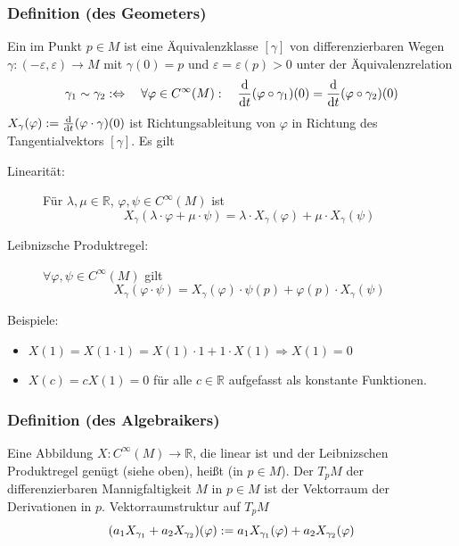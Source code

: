 \subsubsection[Definition: Tangentialraum (geometrisch)]{Definition (des Geometers)} %
\label{ssub:151}
Ein  im Punkt $p \in M$ ist eine Äquivalenzklasse $[\gamma]$ von differenzierbaren Wegen $\gamma : (-\varepsilon, \varepsilon) \to M$ mit 
$\gamma(0)=p$ und $\varepsilon = \varepsilon(p)>0$ unter der Äquivalenzrelation
\[
	\gamma_1 \sim \gamma_2 :\Leftrightarrow \quad \forall \varphi \in C^\infty(M) :\quad  \frac{\mathrm{d} }{\mathrm{d} t} ( \varphi \circ \gamma_1)(0) = \frac{\mathrm{d} }{\mathrm{d} t}  (\varphi \circ \gamma_2) (0)   
\]
$X_\gamma(\varphi) := \frac{\mathrm{d} }{\mathrm{d} t}  (\varphi \cdot \gamma)(0)$ ist  Richtungsableitung von $\varphi$ in Richtung des Tangentialvektors $[\gamma]$. Es gilt
\begin{description}
	\item[Linearität:] Für $\lambda , \mu \in \mathds{R}$, $\varphi, \psi \in C^\infty(M) $ ist
	\[
		X_\gamma(\lambda  \cdot \varphi + \mu \cdot \psi) = \lambda \cdot X_\gamma(\varphi) + \mu \cdot X_\gamma(\psi)
	\] 
	\item[Leibnizsche Produktregel:] $\forall \varphi, \psi \in C^\infty(M) $ gilt
	\[
		X_\gamma(\varphi \cdot \psi) = X_\gamma(\varphi) \cdot \psi(p) + \varphi(p) \cdot X_\gamma(\psi)
	\]
\end{description}
Beispiele:
\begin{itemize}
	\item $X(1) = X(1 \cdot 1) = X(1) \cdot 1 + 1 \cdot X(1) \Rightarrow  X(1) =0$
	\item $X(c)= c X(1) = 0$ für alle $c \in \mathds{R}$ aufgefasst als konstante Funktionen.
\end{itemize}

\subsubsection[Definition: Tangentialraum (algebraisch)]{Definition (des Algebraikers)} %
\label{ssub:152}
Eine Abbildung $X : C^\infty (M) \to \mathds{R}$, die linear ist und der Leibnizschen Produktregel genügt (siehe oben), heißt  (in $p \in M$).
Der  $T_p M$ der differenzierbaren Mannigfaltigkeit $M$ in $p \in M$ ist der Vektorraum der Derivationen in $p$.
Vektorraumstruktur auf $T_p M$
\[
	\enbrace*{a_1 X_{\gamma_1} + a_2 X_{\gamma_2}}(\varphi) := a_1 X_{\gamma_1}(\varphi) + a_2 X_{\gamma_2}(\varphi) 
\]

